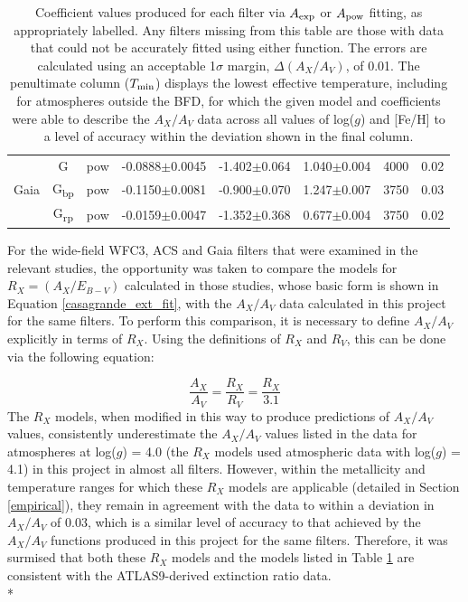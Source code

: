 \documentclass[12pt, a4paper]{report}
\begin{document}
\begin{table}
\begin{center}
{\begin{tabular}{cccccccc}
& G & pow & -0.0888$\pm$0.0045 & -1.402$\pm$0.064 & 1.040$\pm$0.004 & 4000 & 0.02 \\
Gaia & G\textsubscript{bp} & pow & -0.1150$\pm$0.0081 & -0.900$\pm$0.070 & 1.247$\pm$0.007 & 3750 & 0.03 \\
& G\textsubscript{rp} & pow & -0.0159$\pm$0.0047 & -1.352$\pm$0.368 & 0.677$\pm$0.004 & 3750 & 0.02 \\ \hline

\end{tabular}}
\caption{Coefficient values produced for each filter via $A_{\textnormal{exp}}$ or $A_{\textnormal{pow}}$ fitting, as appropriately labelled. Any filters missing from this table are those with data that could not be accurately fitted using either function. The errors are calculated using an acceptable 1$\sigma$ margin, $\Delta(A_{X}/A_{V})$, of 0.01. The penultimate column ($T_{\textnormal{min}}$) displays the lowest effective temperature, including for atmospheres outside the BFD, for which the given model and coefficients were able to describe the $A_{X}/A_{V}$ data across all values of log($g$) and [Fe/H] to a level of accuracy within the deviation shown in the final column.}
\label{simpfunc_coeffs_table}
\end{center}
\end{table}

For the wide-field WFC3, ACS and Gaia \citep{2014MNRAS.444..392C,2018MNRAS.479L.102C} filters that were examined in the relevant studies, the opportunity was taken to compare the models for $R_{X} = (A_{X}/E_{B-V})$ calculated in those studies, whose basic form is shown in Equation \ref{casagrande_ext_fit}, with the $A_{X}/A_{V}$ data calculated in this project for the same filters. To perform this comparison, it is necessary to define $A_{X}/A_{V}$ explicitly in terms of $R_{X}$. Using the definitions of $R_{X}$ and $R_{V}$, this can be done via the following equation:

\begin{equation}
\frac{A_{X}}{A_{V}} = \frac{R_{X}}{R_{V}} = \frac{R_{X}}{3.1}
\label{convert_Rx_to_Ax}
\end{equation}
The $R_{X}$ models, when modified in this way to produce predictions of $A_{X}/A_{V}$ values, consistently underestimate the $A_{X}/A_{V}$ values listed in the data for atmospheres at log($g$) = 4.0 (the $R_{X}$ models used atmospheric data with log($g$) = 4.1) in this project in almost all filters. However, within the metallicity and temperature ranges for which these $R_{X}$ models are applicable (detailed in Section \ref{empirical}), they remain in agreement with the data to within a deviation in $A_{X}/A_{V}$ of 0.03, which is a similar level of accuracy to that achieved by the $A_{X}/A_{V}$ functions produced in this project for the same filters. Therefore, it was surmised that both these $R_{X}$ models and the models listed in Table \ref{simpfunc_coeffs_table} are consistent with the ATLAS9-derived extinction ratio data.\\*
\end{document}
